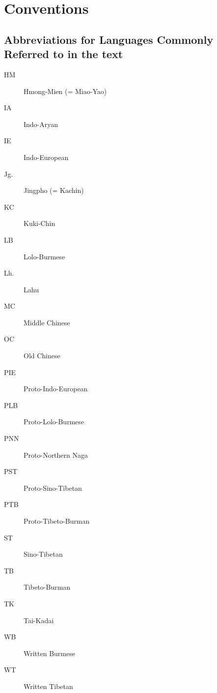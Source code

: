 \vspace{0.25em}

\renewcommand{\thefootnote}{\arabic{footnote}}
\setcounter{footnote}{0}

\chapter*{Conventions}

\renewcommand\thefootnote{*}

\section*{Abbreviations for Languages Commonly Referred to in the text}
\begin{multicols}{2}
\begin{description}
\item[HM]	Hmong-Mien (= Miao-Yao)
\item[IA]	Indo-Aryan
\item[IE]	Indo-European
\item[Jg.]	Jingpho (= Kachin)
\item[KC]	Kuki-Chin
\item[LB]	Lolo-Burmese
\item[Lh.]	Lahu
\item[MC]	Middle Chinese
\item[OC]	Old Chinese
\item[PIE]	Proto-Indo-European
\item[PLB]	Proto-Lolo-Burmese
\item[PNN]	Proto-Northern Naga
\item[PST]	Proto-Sino-Tibetan
\item[PTB]	Proto-Tibeto-Burman
\item[ST]	Sino-Tibetan
\item[TB]	Tibeto-Burman
\item[TK]	Tai-Kadai
\item[WB]	Written Burmese
\item[WT]	Written Tibetan
\end{description}
\end{multicols}

